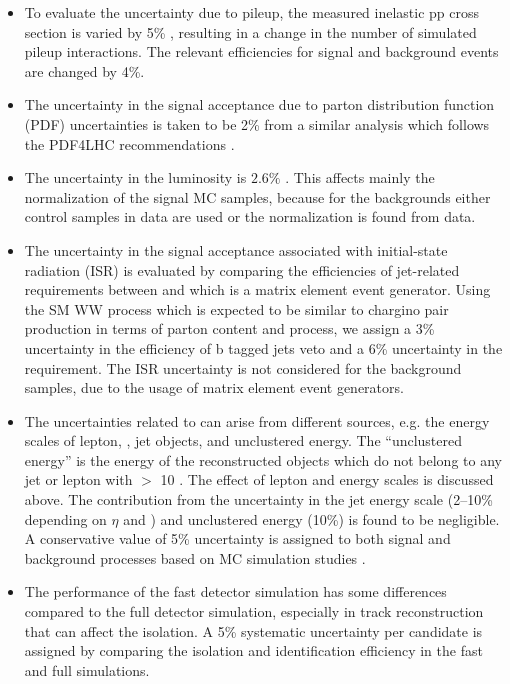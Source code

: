 \begin{itemize}
\item To evaluate the uncertainty due to pileup, the measured inelastic pp cross section is
  varied by 5\% \cite{Antchev:2011vs}, resulting in a change in the number of simulated pileup interactions.
 The relevant efficiencies for signal and background events are changed by 4\%.

\item The uncertainty in the signal acceptance due to parton distribution function (PDF) uncertainties 
  is taken to be 2\% from a similar analysis \cite{Khachatryan:2014qwa} which follows the PDF4LHC recommendations \cite{pdf4lhc}.

\item The uncertainty in the luminosity  is $2.6\%$ \cite{CMS-PAS-LUM-13-001}.  This affects mainly the
  normalization of the signal MC samples, because for the backgrounds  either control samples in data are used or the normalization is found from data.

\item The uncertainty in the signal acceptance associated with initial-state radiation (ISR)
is evaluated by comparing the efficiencies of jet-related requirements between \PYTHIA
 and \MADGRAPH which is a matrix element event generator. Using the SM WW process which
 is expected to be similar to chargino pair production in terms of parton content and process, we assign a 3\% uncertainty in 
the efficiency of  b tagged jets veto and a 6\% uncertainty in the \deltaphi requirement. The ISR
 uncertainty is not considered for the background samples, due to the usage of matrix element event generators.

\item The uncertainties related to \MPT can arise from different sources, e.g.  the energy scales of lepton, \Tau, jet 
objects, and unclustered energy.  The ``unclustered energy'' is the energy of the reconstructed objects which
 do not belong to any jet or lepton with \PT $>$ 10 \GeV. The effect of lepton and \Tau
 energy scales is discussed above. The contribution from the uncertainty in the jet energy scale (2--10\% depending on $\eta$  and \PT) and
 unclustered energy (10\%) is found to be negligible. A conservative value of 5\% uncertainty
 is assigned to both signal and background processes based on MC simulation studies \cite{Khachatryan:2015kxa, Khachatryan:2014qwa}.

\item The performance of the fast detector simulation has some differences compared to the full detector simulation, especially in
 track reconstruction \cite{Khachatryan:2015kxa} that can affect the \Tau isolation. A 5\% systematic uncertainty per
 \Tau candidate is assigned by comparing the \Tau isolation and identification efficiency in the fast
 and full simulations. 



\end{itemize}
